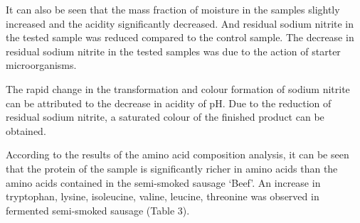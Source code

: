 \begin{multicols}{2}
It can also be seen that the mass fraction of moisture in the samples
slightly increased and the acidity significantly decreased. And residual
sodium nitrite in the tested sample was reduced compared to the control
sample. The decrease in residual sodium nitrite in the tested samples
was due to the action of starter microorganisms.

The rapid change in the transformation and colour formation of sodium
nitrite can be attributed to the decrease in acidity of pH. Due to the
reduction of residual sodium nitrite, a saturated colour of the finished
product can be obtained.

According to the results of the amino acid composition analysis, it can
be seen that the protein of the sample is significantly richer in amino
acids than the amino acids contained in the semi-smoked sausage `Beef'.
An increase in tryptophan, lysine, isoleucine, valine, leucine,
threonine was observed in fermented semi-smoked sausage (Table 3).
\end{multicols}

